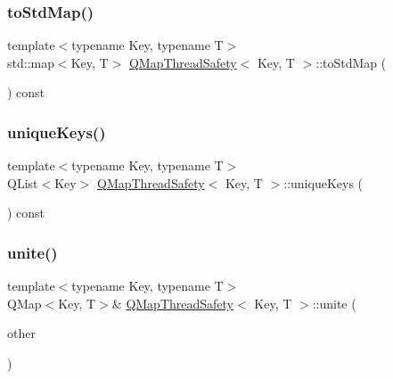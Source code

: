 \mbox{\label{class_q_map_thread_safety_ad145bbf62ebe8d796ed1a8216bfbe69d}} 
\subsubsection{\texorpdfstring{to\+Std\+Map()}{toStdMap()}}
{\footnotesize\ttfamily template$<$typename Key, typename T$>$ \\
std\+::map$<$Key, T$>$ \hyperlink{class_q_map_thread_safety}{Q\+Map\+Thread\+Safety}$<$ Key, T $>$\+::to\+Std\+Map (\begin{DoxyParamCaption}{ }\end{DoxyParamCaption}) const\hspace{0.3cm}{\ttfamily [inline]}}

\mbox{\label{class_q_map_thread_safety_a8d3498ec21684e0c221ce2eddb437ecd}} 
\subsubsection{\texorpdfstring{unique\+Keys()}{uniqueKeys()}}
{\footnotesize\ttfamily template$<$typename Key, typename T$>$ \\
Q\+List$<$Key$>$ \hyperlink{class_q_map_thread_safety}{Q\+Map\+Thread\+Safety}$<$ Key, T $>$\+::unique\+Keys (\begin{DoxyParamCaption}{ }\end{DoxyParamCaption}) const\hspace{0.3cm}{\ttfamily [inline]}}

\mbox{\label{class_q_map_thread_safety_a784205cd91eaed840f8d2554a07d3c22}} 
\subsubsection{\texorpdfstring{unite()}{unite()}}
{\footnotesize\ttfamily template$<$typename Key, typename T$>$ \\
Q\+Map$<$Key, T$>$\& \hyperlink{class_q_map_thread_safety}{Q\+Map\+Thread\+Safety}$<$ Key, T $>$\+::unite (\begin{DoxyParamCaption}\item[{const Q\+Map$<$ Key, T $>$ \&}]{other }\end{DoxyParamCaption})\hspace{0.3cm}{\ttfamily [inline]}}

